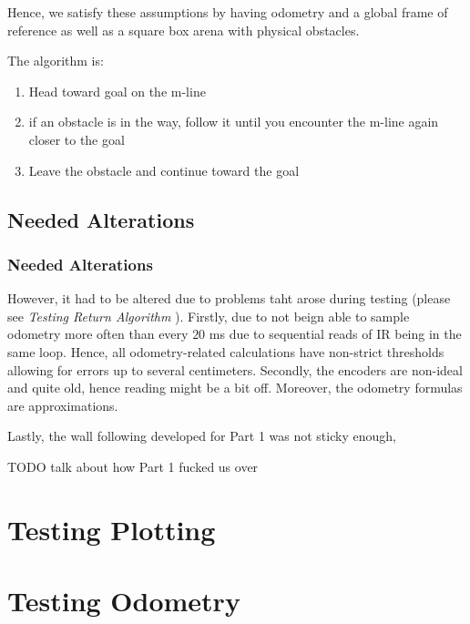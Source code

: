 \documentclass[11pt, a4paper]{article}
\begin{document}
Hence, we satisfy these assumptions by having odometry and a global frame of reference as well 
as a square box arena with physical obstacles.

The algorithm is:

\begin{enumerate}

	\item Head toward goal on the m-line
	\item if an obstacle is in the way, follow it until you encounter the m-line again closer to the goal
	\item Leave the obstacle and continue toward the goal

\end{enumerate}

\subsection{Needed Alterations}

\subsubsection{Needed Alterations}
However, it had to be altered due to problems taht arose during testing (please see 
\textit{Testing Return Algorithm} ). Firstly, due to not beign able to sample odometry more often than 
every $20$ ms\cite{khepera_manual} due to sequential reads of IR being in the same loop. Hence,
all odometry-related calculations have non-strict thresholds allowing for errors up to several 
centimeters. Secondly, the encoders are non-ideal and quite old, hence reading might be a bit off.
Moreover, the odometry formulas are approximations. 



Lastly, the wall following developed for Part 1
was not sticky enough,

TODO talk about how Part 1 fucked us over



\section{Testing Plotting}




\section{Testing Odometry}
\end{document}
